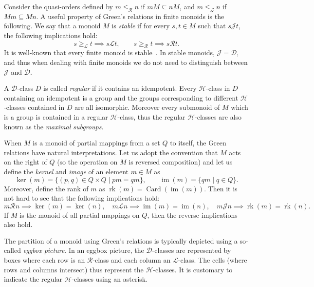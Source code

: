 \documentclass[a4paper,UKenglish,numberwithinsect,cleveref]{lipics-v2021}
\newcommand{\HH}{\mathrel{\mathscr{H}}}
\newcommand{\JJ}{\mathrel{\mathscr{J}}}
\newcommand{\DD}{\mathrel{\mathscr{D}}}
\newcommand{\RR}{\mathrel{\mathscr{R}}}
\newcommand{\LL}{\mathrel{\mathscr{L}}}
\newcommand*{\Card}{\operatorname{Card}}
\newcommand*{\Image}{\operatorname{im}}
\newcommand*{\rank}{\operatorname{rk}}
\begin{document}
Consider the quasi-orders defined by $m\leq_{\RR}n$ if $mM\subseteq nM$, and $m\leq_{\LL}n$ if $Mm\subseteq Mn$. A useful property of Green's relations in finite monoids is the following. We say that a monoid $M$ is \emph{stable} if for every $s,t\in M$ such that $s\JJ t$, the following implications hold:
\begin{equation*}
    s\geq_{\LL} t\implies s\LL t,\qquad s\geq_{\RR} t \implies s\RR t.
\end{equation*}
It is well-known that every finite monoid is stable~\cite[Lemma 1.1, Chapter V]{book/Grillet1995}. In stable monoids, $\JJ=\DD$, and thus when dealing with finite monoids we do not need to distinguish between $\JJ$ and $\DD$.

A $\DD$-class $D$ is called \emph{regular} if it contains an idempotent. Every $\HH$-class in $D$ containing an idempotent is a group and the groups corresponding to different $\HH$-classes contained in $D$ are all isomorphic. Moreover every submonoid of $M$ which is a group is contained in a regular $\HH$-class, thus the regular $\HH$-classes are also known as the \emph{maximal subgroups}.

When $M$ is a monoid of partial mappings from a set $Q$ to itself, the Green relations have natural interpretations. Let us adopt the convention that $M$ acts on the right of $Q$ (so the operation on $M$ is reversed composition) and let us define the \emph{kernel} and \emph{image} of an element $m\in M$ as 
\begin{equation*}
    \ker(m) = \{ (p,q)\in Q\times Q \mid pm = qm\},\qquad \Image(m) = \{qm \mid q\in Q\}.
\end{equation*}
Moreover, define the rank of $m$ as $\rank(m) = \Card(\Image(m))$. Then it is not hard to see that the following implications hold:
\[
    m\RR n\implies \ker(m)=\ker(n),\quad m \LL n \implies \Image(m)=\Image(n),\quad m\JJ n \implies \rank(m) = \rank(n).
\]
If $M$ is the monoid of all partial mappings on $Q$, then the reverse implications also hold.

The partition of a monoid using Green's relations is typically depicted using a so-called \emph{eggbox picture}. In an eggbox picture, the $\DD$-classes are represented by boxes where each row is an $\RR$-class and each column an $\LL$-class. The cells (where rows and columns intersect) thus represent the $\HH$-classes. It is customary to indicate the regular $\HH$-classes using an asterisk.
\end{document}
